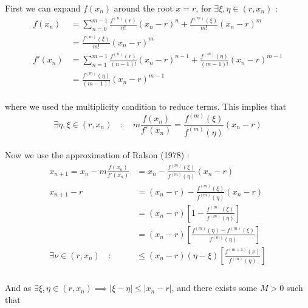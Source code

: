 \documentclass[paper=a4, fontsize=11pt]{scrartcl}
\begin{document}
First we can expand $f(x_n)$ around the root $x=r$, for $\exists \xi,\eta \in (r,x_n)$ :\\

\begin{equation}\nonumber
	\begin{split}
		f(x_n) &= \sum^{m-1}_{n=0} \frac{f^{(n)}(r)}{n!}(x_n-r)^n + \frac{f^{(m)}(\xi)}{m!}(x_n - r)^m  \\[2.5ex]
		&= \frac{f^{(m)}(\xi)}{m!}(x_n - r)^m \\[3.5ex]
		f'(x_n) &= \sum^{m-1}_{n=1} \frac{f^{(n)}(r)}{(n-1)!}(x_n-r)^{n-1} + \frac{f^{(m)}(\eta)}{(m-1)!}(x_n - r)^{m-1} \\[2.5ex]
		&= \frac{f^{(m)}(\eta)}{(m-1)!}(x_n - r)^{m-1} 
	\end{split}
\end{equation}\\

where we used the multiplicity condition to reduce terms. This implies that \\

\begin{equation}\nonumber
	\exists \eta,\xi \in (r,x_n) \quad : \quad m \frac{f(x_n)}{f'(x_n)} = \frac{f^{(m)}(\xi)}{f^{(m)}(\eta)} (x_n - r)
\end{equation}\\

Now we use the approximation of Ralson (1978) : \\

\begin{equation}\nonumber
	\begin{split}
	x_{n+1} = x_n - m \frac{f(x_n)}{f'(x_n)} &= x_n - \frac{f^{(m)}(\xi)}{f^{(m)}(\eta)} (x_n - r) \\[2.5ex]
	x_{n+1} -r &= (x_n - r) - \frac{f^{(m)}(\xi)}{f^{(m)}(\eta)} (x_n - r) \\[2.5ex]
	 &= (x_n - r)  \left[ 1- \frac{f^{(m)}(\xi)}{f^{(m)}(\eta)} \right] \\[2.5ex]
	 &= (x_n - r)  \left[ \frac{ f^{(m)}(\eta)- f^{(m)}(\xi)  }{f^{(m)}(\eta)}\right] \\[2.5ex]
	\exists \nu \in (r,x_n) \quad : \quad &\leq  (x_n - r) (\eta - \xi) \left[\frac{f^{(m+1)}(\nu)}{f^{(m)}(\eta)}\right]\\
	\end{split}
\end{equation}\\

And as $\exists \xi, \eta \in (r,x_n) \implies |\xi - \eta|\leq |x_n -r|$, and there exists some $M>0$ such that \\
\end{document}
